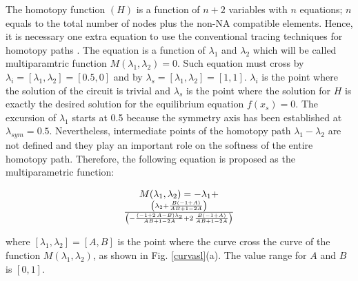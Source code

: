 \documentclass[conference,letterpaper,twocolumn]{IEEEtran}
\begin{document}
The homotopy function $(H)$ is a function of $n+2$ variables with $n$ equations; $n$ equals to the total number of nodes plus the non-NA compatible elements. Hence, it is necessary one extra equation to use the conventional tracing techniques for homotopy paths \cite{homo_allgower}. The equation is a function of $\lambda_1$ and $\lambda_2$ which will be called multiparamtric function $M(\lambda_1,\lambda_2)=0$. Such equation must cross by ${\lambda}_i=[\lambda_1,\lambda_2]=[0.5,0]$ and by ${\lambda}_s=[\lambda_1,\lambda_2]=[1,1]$. ${\lambda}_i$ is the point where the solution of the circuit is trivial and ${\lambda}_s$ is the point where the solution for ${H}$ is exactly the desired solution for the equilibrium equation ${f}({x}_s)=0$. The excursion of $\lambda_1$ starts at 0.5 because the symmetry axis has been established at $\lambda_{sym}=0.5$. Nevertheless, intermediate points of the homotopy path $\lambda_1-\lambda_2$ are not defined and they play an important role on the softness of the entire homotopy path. Therefore, the following equation is proposed as the multiparametric function:

{
\begin{equation}
\begin{array}{c}
M(\lambda_1,\lambda_2)=-\lambda_{{1}}+\\ { \left( \lambda_{{2}}+{\frac {B \left( - 1+A \right) }
{AB+ 1- 2A}} \right) \over  \left( -{\frac { \left( - 1+ 2\,
A- B \right) \lambda_{{2}}}{AB+ 1- 2A}}+ 2\,{\frac {B
 \left( - 1+A \right) }{AB+ 1- 2A}} \right) }
\end{array}
\label{homotopiaPx4}
\end{equation}
}

where $[\lambda_1,\lambda_2]=[A,B]$ is the point where the curve cross the curve of the function $M(\lambda_1,\lambda_2)$, as shown in Fig. \ref{curvasl}(a). The value range for $A$ and $B$ is $[0,1]$.
\end{document}
